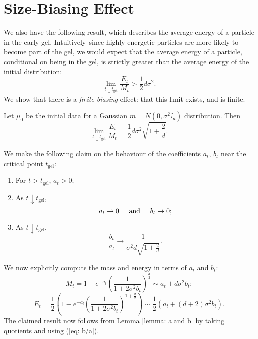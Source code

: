 \section{Size-Biasing Effect} \iffalse
We also have the following result, which describes the average energy of a particle in the early gel. Intuitively, since highly energetic particles are more likely to become part of the gel, we would expect that the average energy of a particle, conditional on being in the gel, is strictly greater than the average energy of the initial distribution:  \begin{equation}
    \lim_{t\downarrow t_\text{gel}} \frac{E_t}{M_t}>\frac{1}{2}d\sigma^2.
\end{equation}We show that there is a \emph{finite biasing} effect: that this limit exists, and is finite. 
\begin{theorem} Let $\mu_0$ be the initial data for a Gaussian $m=N(0, \sigma^2 I_d)$ distribution. Then \begin{equation}
    \lim_{t\downarrow t_\text{gel}}\frac{E_t}{M_t}=\frac{1}{2}d\sigma^2
\sqrt{1+\frac{2}{d}}.
\end{equation}  \end{theorem}  We make the following claim on the behaviour of the coefficients $a_t$, $b_t$ near the critical point $t_\text{gel}$: \begin{lemma}\label{lemma: a and b}\begin{enumerate}[label=\roman{*}).]
    \item For $t>t_\text{gel}$, $a_t>0$;
    \item As $t\downarrow t_\text{gel}$, \begin{equation}
        a_t \rightarrow 0 \hspace{0.5cm} \text{and} \hspace{0.5cm} b_t\rightarrow 0;
    \end{equation}
    \item As $t\downarrow t_\text{gel}$, \begin{equation} \label{eq: b/a}
        \frac{b_t}{a_t}\rightarrow \frac{1}{\sigma^2d\sqrt{1+\frac{2}{d}}}.
    \end{equation}
\end{enumerate}  \end{lemma}  We now explicitly compute the mass and energy in terms of $a_t$ and $b_t$:\begin{equation}
    M_t=1-e^{-a_t}\left(\frac{1}{1+2\sigma^2b_t}\right)^\frac{d}{2}\sim a_t+d\sigma^2 b_t;
\end{equation}\begin{equation}
    E_t=\frac{1}{2}\left(1-e^{-a_t}\left(\frac{1}{1+2\sigma^2b_t}\right)^{1+\frac{d}{2}}\right)\sim \frac{1}{2}(a_t+(d+2)\sigma^2 b_t).
\end{equation} The claimed result now follows from Lemma \ref{lemma: a and b} by taking quotients and using (\ref{eq: b/a}). 
